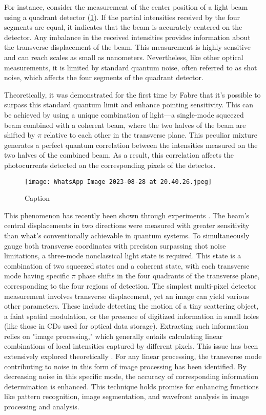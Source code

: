 \documentclass{article}
\begin{document}
For instance, consider the measurement of the center position of a light beam using a quadrant detector (\ref{f-1}). If the partial intensities received by the four segments are equal, it indicates that the beam is accurately centered on the detector. Any imbalance in the received intensities provides information about the transverse displacement of the beam. This measurement is highly sensitive and can reach scales as small as nanometers. Nevertheless, like other optical measurements, it is limited by standard quantum noise, often referred to as shot noise, which affects the four segments of the quadrant detector.

Theoretically, it was demonstrated for the first time by Fabre \cite{Fabre:00} that it's possible to surpass this standard quantum limit and enhance pointing sensitivity. This can be achieved by using a unique combination of light—a single-mode squeezed beam combined with a coherent beam, where the two halves of the beam are shifted by $\pi$ relative to each other in the transverse plane. This peculiar mixture generates a perfect quantum correlation between the intensities measured on the two halves of the combined beam. As a result, this correlation affects the photocurrents detected on the corresponding pixels of the detector.


\begin{figure}
    \centering
    \texttt{[image: WhatsApp Image 2023-08-28 at 20.40.26.jpeg]}
    \caption{Caption}
    \label{f-1}
\end{figure}
This phenomenon has recently been shown through experiments \cite{doi:10.1126/science.1086489}. The beam's central displacements in two directions were measured with greater sensitivity than what's conventionally achievable in quantum systems. To simultaneously gauge both transverse coordinates with precision surpassing shot noise limitations, a three-mode nonclassical light state is required. This state is a combination of two squeezed states and a coherent state, with each transverse mode having specific $\pi$ phase shifts in the four quadrants of the transverse plane, corresponding to the four regions of detection. The simplest multi-pixel detector measurement involves transverse displacement, yet an image can yield various other parameters. These include detecting the motion of a tiny scattering object, a faint spatial modulation, or the presence of digitized information in small holes (like those in CDs used for optical data storage). Extracting such information relies on "image processing," which generally entails calculating linear combinations of local intensities captured by different pixels. This issue has been extensively explored theoretically \cite{PhysRevA.71.013820}. For any linear processing, the transverse mode contributing to noise in this form of image processing has been identified. By decreasing noise in this specific mode, the accuracy of corresponding information determination is enhanced. This technique holds promise for enhancing functions like pattern recognition, image segmentation, and wavefront analysis in image processing and analysis.
\end{document}
